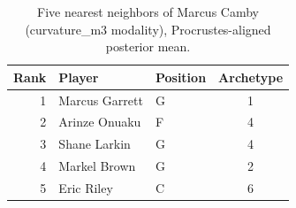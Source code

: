 \begin{table}[htbp]
  \centering\small
  \begin{tabular}{rllc}
    \toprule
    Rank & Player & Position & Archetype \\
    \midrule
    1 & Marcus Garrett & G & 1 \\
    2 & Arinze Onuaku & F & 4 \\
    3 & Shane Larkin & G & 4 \\
    4 & Markel Brown & G & 2 \\
    5 & Eric Riley & C & 6 \\
    \bottomrule
  \end{tabular}
  \caption{Five nearest neighbors of Marcus Camby (curvature_m3 modality), Procrustes-aligned posterior mean.}
  \label{tab:Marcus_Camby_neighbors_curvature_m3}
\end{table}

